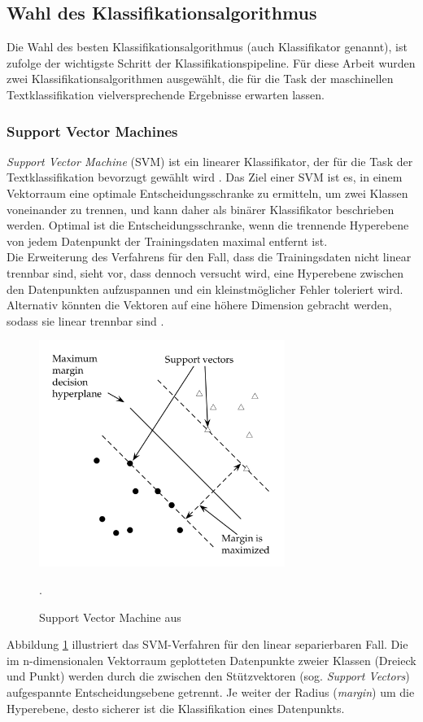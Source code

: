 \documentclass[ngerman]{ttlab-qualify}
\begin{document}
\subsection{Wahl des Klassifikationsalgorithmus}
Die Wahl des besten Klassifikationsalgorithmus (auch Klassifikator genannt), ist \textcite{Kowsari_2019} zufolge der wichtigste Schritt der Klassifikationspipeline.
Für diese Arbeit wurden zwei Klassifikationsalgorithmen ausgewählt, die für die Task der maschinellen Textklassifikation vielversprechende Ergebnisse erwarten lassen.

\subsubsection{Support Vector Machines}
\textit{Support Vector Machine} (SVM) ist ein linearer Klassifikator, der für die Task der Textklassifikation bevorzugt gewählt wird \parencite{manning2008introduction}. Das Ziel einer SVM ist es, in einem Vektorraum eine optimale Entscheidungsschranke zu ermitteln, um zwei Klassen voneinander zu trennen, und kann daher als binärer Klassifikator beschrieben werden. Optimal ist die Entscheidungsschranke, wenn die trennende Hyperebene von jedem Datenpunkt der Trainingsdaten maximal entfernt ist.\\
Die Erweiterung des Verfahrens für den Fall, dass die Trainingsdaten nicht linear trennbar sind, sieht vor, dass dennoch versucht wird, eine Hyperebene zwischen den Datenpunkten aufzuspannen und ein kleinstmöglicher Fehler toleriert wird. Alternativ könnten die Vektoren auf eine höhere Dimension gebracht werden, sodass sie linear trennbar sind \parencite{manning2008introduction}.
\begin{figure}[H]
\begin{center}
\includegraphics[width=8cm]{grafiken/SVM_Intro_IR_S.320.jpeg}
\caption[Support Vector Machine]{Support Vector Machine aus \textcite[S. 320]{manning2008introduction}}.
\label{SVM}
\end{center} 
\end{figure}
\noindent Abbildung \ref{SVM} illustriert das SVM-Verfahren für den linear separierbaren Fall. Die im n-dimensionalen Vektorraum geplotteten Datenpunkte zweier Klassen (Dreieck und Punkt) werden durch die zwischen den Stützvektoren (sog. \textit{Support Vectors}) aufgespannte Entscheidungsebene getrennt. Je weiter der Radius (\textit{margin}) um die Hyperebene, desto sicherer ist die Klassifikation eines Datenpunkts.
\end{document}
